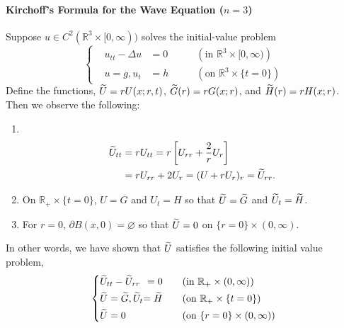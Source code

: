 \documentclass{article}
\numberwithin{equation}{section}
\begin{document}
	\paragraph{Kirchoff's Formula for the Wave Equation \texorpdfstring{($n = 3$)}{n =3}}
	Suppose $u \in C^{2}(\mathbb{R}^{3} \times [0,\infty))$ solves the initial-value problem 
	\begin{equation}
		\left\{
		\begin{alignedat}{3}
			&u_{tt} - \Delta u &= 0 &\qquad (\text{in $\mathbb{R}^{3} \times [0,\infty)$}) \\
			&u = g, u_{t} &=h &\qquad (\text{on $\mathbb{R}^{3} \times \{t = 0\}$})
		\end{alignedat}
		\right.
	\end{equation}
	Define the functions, $\widetilde{U} = rU(x;r, t)$, $\widetilde{G}(r) = rG(x;r)$, and $\widetilde{H}(r) = rH(x;r)$. Then we observe the following: 
	\begin{enumerate}[itemsep =-2pt, label = (\roman{*})]
		\item $ $\newline \vspace{-0.75cm}
		\begin{align*}
			\begin{split}
				\widetilde{U}_{tt} &= rU_{tt} = r\left[U_{rr} + \frac{2}{r}U_{r}\right] \\
				&= rU_{rr} + 2U_{r} = (U + rU_{r})_{r} = \widetilde{U}_{rr}. 
			\end{split}
		\end{align*}
		\item On $\mathbb{R}_{+} \times \{t = 0\}$, $U = G$ and $U_{t} = H$ so that $\widetilde{U} =\widetilde{G}$ and $\widetilde{U}_{t} = \widetilde{H}$. 
		\item For $r = 0$, $\partial B(x, 0) = \varnothing$ so that $\widetilde{U} = 0$ on $\{r = 0\} \times (0, \infty)$. 
	\end{enumerate}
	In other words, we have shown that $\widetilde{U}$ satisfies the following initial value problem, 
	\begin{equation*}
		\left\{
		\begin{alignedat}{3}
			&\widetilde{U}_{tt} - \widetilde{U}_{rr} &= 0 &\qquad (\text{in $\mathbb{R}_{+} \times (0,\infty)$}) \\
			&\widetilde{U} = \widetilde{G}, \widetilde{U}_{t} &= \widetilde{H} &\qquad (\text{on $\mathbb{R}_{+} \times \{t = 0\}$}) \\
			&\widetilde{U} = 0 &&\qquad (\text{on $\{r = 0\} \times (0,\infty)$})
		\end{alignedat}
		\right.
	\end{equation*}
\end{document}
